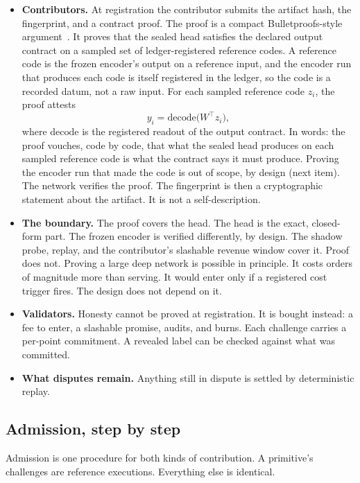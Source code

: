 \documentclass[11pt]{article}
\begin{document}
\begin{itemize}
\item \textbf{Contributors.} At registration the contributor
submits the artifact hash, the fingerprint, and a contract proof.
The proof is a compact Bulletproofs-style
argument~\cite{bunz2018}. It proves that the sealed head
satisfies the declared output contract on a sampled set of
ledger-registered reference codes. A reference code is the frozen
encoder's output on a reference input, and the encoder run that
produces each code is itself registered in the ledger, so the
code is a recorded datum, not a raw input. For each sampled
reference code $z_i$, the proof attests
\begin{equation}
y_i = \mathrm{decode}\bigl(W^\top z_i\bigr),
\end{equation}
where $\mathrm{decode}$ is the registered readout of the output
contract. In words: the proof vouches, code by code, that what
the sealed head produces on each sampled reference code is what
the contract says it must produce. Proving the encoder run that
made the code is out of scope, by design (next item). The network
verifies the proof. The fingerprint is then a cryptographic
statement about
the artifact.
It is not a self-description.
\item \textbf{The boundary.} The proof covers the head. The head
is the exact, closed-form part. The frozen encoder is verified
differently, by design. The shadow probe, replay, and the
contributor's slashable revenue window cover it. Proof does not.
Proving a large deep network is possible in principle. It costs
orders of magnitude more than serving. It would enter only if a
registered cost trigger fires. The design does not depend on it.
\item \textbf{Validators.} Honesty cannot be proved at
registration. It is bought instead: a fee to enter, a slashable
promise, audits, and burns. Each challenge carries a per-point
commitment. A revealed label can be checked against what was
committed.
\item \textbf{What disputes remain.} Anything still in dispute is
settled by deterministic replay.
\end{itemize}

\subsection{Admission, step by step}

Admission is one procedure for both kinds of contribution. A
primitive's challenges are reference executions. Everything else
is identical.
\end{document}

